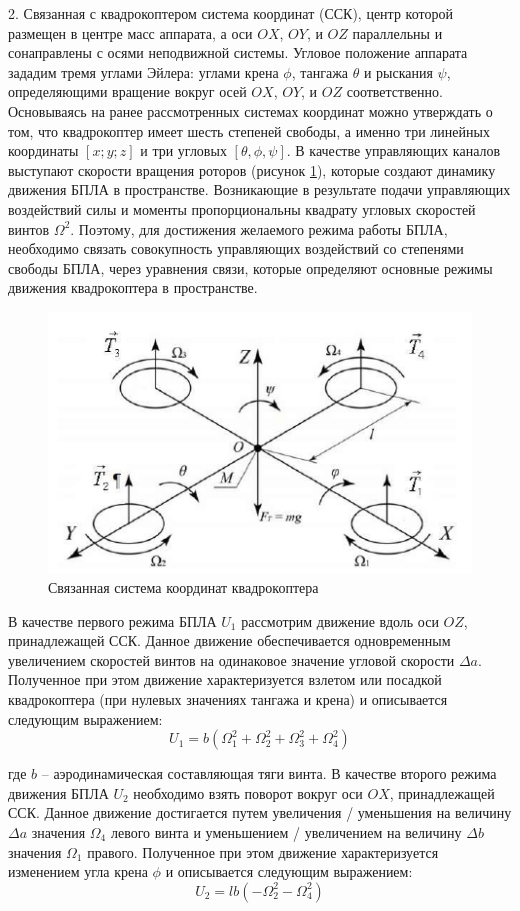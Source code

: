2. Связанная с квадрокоптером система координат (ССК), центр которой размещен в центре масс аппарата, а оси \(OX\), \(OY\), и \(OZ\) параллельны и сонаправлены с осями неподвижной системы. Угловое положение аппарата зададим тремя углами Эйлера: углами крена \(\phi\), тангажа \(\theta\) и рыскания \(\psi\), определяющими вращение вокруг осей \(OX\), \(OY\), и \(OZ\) соответственно. Основываясь на ранее рассмотренных системах координат можно утверждать о том, что квадрокоптер имеет шесть степеней свободы, а именно три линейных координаты \([x; y; z ]\) и три угловых \([\theta, \phi, \psi]\). В качестве управляющих каналов выступают скорости вращения роторов (рисунок \ref{fig:ris1}), которые создают динамику движения БПЛА в пространстве. Возникающие в результате подачи управляющих воздействий силы и моменты пропорциональны квадрату угловых скоростей винтов \(\Omega^2\). Поэтому, для достижения желаемого режима работы БПЛА, необходимо связать совокупность управляющих воздействий со степенями свободы БПЛА, через уравнения связи, которые определяют основные режимы движения квадрокоптера в пространстве.
\begin{figure}[H]
	\centering
	\includegraphics[width=0.5\linewidth]{../RW/pics/ris1}
	\caption{Связанная система координат квадрокоптера
	}
	\label{fig:ris1}
\end{figure}

В качестве первого режима БПЛА \(U_{1}\) рассмотрим движение вдоль оси \(OZ\), принадлежащей ССК. Данное движение обеспечивается одновременным увеличением скоростей винтов на одинаковое значение угловой скорости \(\Delta a\). Полученное при этом движение характеризуется взлетом или посадкой квадрокоптера (при нулевых значениях тангажа и крена) и описывается следующим выражением:
\begin{equation}
U_{1}=b(\Omega_{1}^2+\Omega_{2}^2+\Omega_{3}^2+\Omega_{4}^2)
\end{equation}

где \(b\) -- аэродинамическая составляющая тяги винта.
В качестве второго режима движения БПЛА \(U_{2}\) необходимо взять поворот вокруг оси \(OX\), принадлежащей ССК. Данное движение достигается путем увеличения / уменьшения на величину \(\Delta a\) значения \(\Omega_{4}\) левого винта и уменьшением / увеличением на величину \(\Delta b\) значения \(\Omega_{1}\)
правого. Полученное при этом движение характеризуется изменением угла крена \(\phi\) и описывается следующим выражением:
\begin{equation}
U_{2}=lb(-\Omega_{2}^2-\Omega_{4}^2)
\end{equation}


